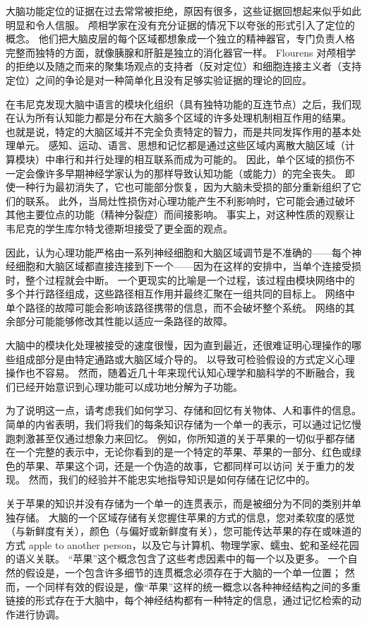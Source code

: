 大脑功能定位的证据在过去常常被拒绝，原因有很多，这些证据回想起来似乎如此明显和令人信服。
颅相学家在没有充分证据的情况下以夸张的形式引入了定位的概念。
他们把大脑皮层的每个区域都想象成一个独立的精神器官，专门负责人格完整而独特的方面，就像胰腺和肝脏是独立的消化器官一样。
Flourens 对颅相学的拒绝以及随之而来的聚集场观点的支持者（反对定位）和细胞连接主义者（支持定位）之间的争论是对一种简单化且没有足够实验证据的理论的回应。


在韦尼克发现大脑中语言的模块化组织（具有独特功能的互连节点）之后，我们现在认为所有认知能力都是分布在大脑多个区域的许多处理机制相互作用的结果。
也就是说，特定的大脑区域并不完全负责特定的智力，而是共同发挥作用的基本处理单元。
感知、运动、语言、思想和记忆都是通过这些区域内离散大脑区域（计算模块）中串行和并行处理的相互联系而成为可能的。
因此，单个区域的损伤不一定会像许多早期神经学家认为的那样导致认知功能（或能力）的完全丧失。
即使一种行为最初消失了，它也可能部分恢复，因为大脑未受损的部分重新组织了它们的联系。
此外，当局灶性损伤对心理功能产生不利影响时，它可能会通过破坏其他主要位点的功能（精神分裂症）而间接影响。
事实上，对这种性质的观察让韦尼克的学生库尔特戈德斯坦接受了更全面的观点。


因此，认为心理功能严格由一系列神经细胞和大脑区域调节是不准确的——每个神经细胞和大脑区域都直接连接到下一个——因为在这样的安排中，当单个连接受损时，整个过程就会中断。
一个更现实的比喻是一个过程，该过程由模块网络中的多个并行路径组成，这些路径相互作用并最终汇聚在一组共同的目标上。
网络中单个路径的故障可能会影响该路径携带的信息，而不会破坏整个系统。
网络的其余部分可能能够修改其性能以适应一条路径的故障。


大脑中的模块化处理被接受的速度很慢，因为直到最近，还很难证明心理操作的哪些组成部分是由特定通路或大脑区域介导的。
以导致可检验假设的方式定义心理操作也不容易。
然而，随着近几十年来现代认知心理学和脑科学的不断融合，我们已经开始意识到心理功能可以成功地分解为子功能。


为了说明这一点，请考虑我们如何学习、存储和回忆有关物体、人和事件的信息。
简单的内省表明，我们将我们的每条知识存储为一个单一的表示，可以通过记忆慢跑刺激甚至仅通过想象力来回忆。
例如，你所知道的关于苹果的一切似乎都存储在一个完整的表示中，无论你看到的是一个特定的苹果、苹果的一部分、红色或绿色的苹果、苹果这个词，还是一个伪造的故事，它都同样可以访问 关于重力的发现。
然而，我们的经验并不能忠实地指导知识是如何存储在记忆中的。


关于苹果的知识并没有存储为一个单一的连贯表示，而是被细分为不同的类别并单独存储。
大脑的一个区域存储有关您握住苹果的方式的信息，您对柔软度的感觉（与新鲜度有关），颜色（与偏好或新鲜度有关），您可能传达苹果的存在或味道的方式 apple to another person，以及它与计算机、物理学家、蠕虫、蛇和圣经花园的语义关联。
“苹果”这个概念包含了这些考虑因素中的每一个以及更多。
一个自然的假设是，一个包含许多细节的连贯概念必须存在于大脑的一个单一位置；
然而，一个同样有效的假设是，像“苹果”这样的统一概念以各种神经结构之间的多重链接的形式存在于大脑中，每个神经结构都有一种特定的信息，通过记忆检索的动作进行协调。


